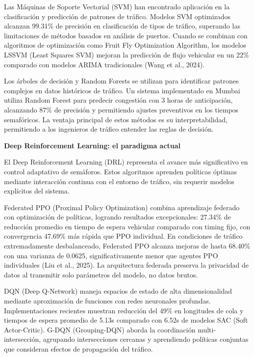 \documentclass[12pt,a4paper,oneside]{report}
\begin{document}
Las Máquinas de Soporte Vectorial (SVM) han encontrado aplicación en la clasificación y predicción de patrones de tráfico. Modelos SVM optimizados alcanzan 99.31\% de precisión en clasificación de tipos de tráfico, superando las limitaciones de métodos basados en análisis de puertos. Cuando se combinan con algoritmos de optimización como Fruit Fly Optimization Algorithm, los modelos LSSVM (Least Squares SVM) mejoran la predicción de flujo vehicular en un 22\% comparado con modelos ARIMA tradicionales (Wang et al., 2024).

Los árboles de decisión y Random Forests se utilizan para identificar patrones complejos en datos históricos de tráfico. Un sistema implementado en Mumbai utiliza Random Forest para predecir congestión con 3 horas de anticipación, alcanzando 87\% de precisión y permitiendo ajustes preventivos en los tiempos semafóricos. La ventaja principal de estos métodos es su interpretabilidad, permitiendo a los ingenieros de tráfico entender las reglas de decisión.

\textbf{Deep Reinforcement Learning: el paradigma actual}

El Deep Reinforcement Learning (DRL) representa el avance más significativo en control adaptativo de semáforos. Estos algoritmos aprenden políticas óptimas mediante interacción continua con el entorno de tráfico, sin requerir modelos explícitos del sistema.

Federated PPO (Proximal Policy Optimization) combina aprendizaje federado con optimización de políticas, logrando resultados excepcionales: 27.34\% de reducción promedio en tiempo de espera vehicular comparado con timing fijo, con convergencia 47.69\% más rápida que PPO individual. En condiciones de tráfico extremadamente desbalanceado, Federated PPO alcanza mejoras de hasta 68.40\% con una varianza de 0.0625, significativamente menor que agentes PPO individuales (Liu et al., 2025). La arquitectura federada preserva la privacidad de datos al transmitir solo parámetros del modelo, no datos brutos.

DQN (Deep Q-Network) maneja espacios de estado de alta dimensionalidad mediante aproximación de funciones con redes neuronales profundas. Implementaciones recientes muestran reducción del 49\% en longitudes de cola y tiempos de espera promedio de 5.13s comparado con 6.52s de modelos SAC (Soft Actor-Critic). G-DQN (Grouping-DQN) aborda la coordinación multi-intersección, agrupando intersecciones cercanas y aprendiendo políticas conjuntas que consideran efectos de propagación del tráfico.
\end{document}
